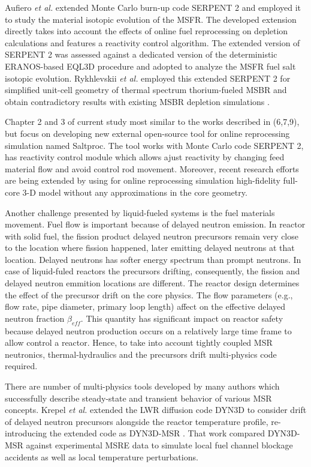 Aufiero \emph{et al.} extended Monte Carlo burn-up code SERPENT 2 and employed it to study the material isotopic evolution of the \gls{MSFR}. The developed extension directly takes into account the effects of online fuel reprocessing on depletion calculations and features a reactivity control algorithm. The extended version of SERPENT 2 was assessed against a dedicated version of the deterministic ERANOS-based EQL3D procedure \cite{ruggieri_eranos_2006} and adopted to analyze the \gls{MSFR} fuel salt isotopic evolution. Rykhlevskii \emph{et al.} employed this extended SERPENT 2 for simplified unit-cell geometry of thermal spectrum thorium-fueled \gls{MSBR} and obtain contradictory results with existing \gls{MSBR} depletion simulations \cite{jeong_equilibrium_2016}.

Chapter 2 and 3 of current study most similar to the works described in (6,7,9), but focus on developing new external open-source tool for online reprocessing simulation named Saltproc. The tool works with Monte Carlo code SERPENT 2, has reactivity control module which allows ajust reactivity by changing feed material flow and avoid control rod movement. Moreover, recent research efforts are being extended by using for online reprocessing simulation high-fidelity full-core 3-D model without any approximations in the core geometry.

Another challenge presented by liquid-fueled systems is the fuel materials movement. Fuel flow is important because of delayed neutron emission. In reactor with solid fuel, the fission product delayed neutron precursors remain very close to the location where fission happened, later emitting delayed neutrons at that location. Delayed neutrons has softer energy spectrum than prompt neutrons. In case of liquid-fuled reactors the precursors drifting, consequently, the fission and delayed neutron emmition locations are different. The reactor design determines the effect of the precursor drift on the core physics. The flow parameters (e.g., flow rate, pipe diameter, primary loop length) affect on the effective delayed neutron fraction $\beta_{eff}$. This quantity has significant impact on reactor safety because delayed neutron production occurs on a relatively large time frame to allow control a reactor. Hence, to take into account tightly coupled \gls{MSR} neutronics, thermal-hydraulics and the precursors drift multi-physics code required.

There are number of multi-physics tools developed by many authors which successfully describe steady-state and transient behavior of various \gls{MSR} concepts. Krepel \emph{et al.} extended the \gls{LWR} diffusion code DYN3D to consider drift of delayed neutron precursors alongside the reactor temperature profile, re-introducing the extended code as DYN3D-MSR \cite{krepel_dyn3d-msr_2007}. That work compared DYN3D-MSR against experimental \gls{MSRE} data to simulate local fuel channel blockage accidents as well as local temperature perturbations.

